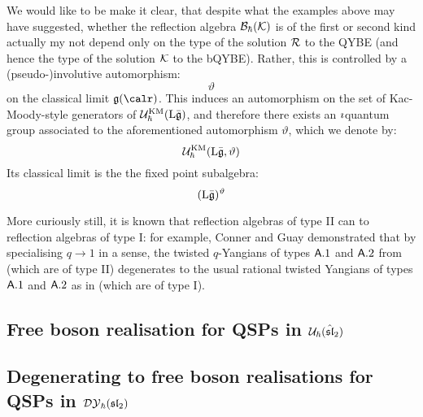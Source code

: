         We would like to be make it clear, that despite what the examples above may have suggested, whether the reflection algebra $\mathcal{B}_{\hbar}(\mathcal{K})$ is of the first or second kind actually my not depend only on the type of the solution $\mathcal{R}$ to the QYBE (and hence the type of the solution $\mathcal{K}$ to the bQYBE). Rather, this is controlled by a (pseudo-)involutive automorphism:
            $$\vartheta$$
        on the classical limit $\g(\calr)$. This induces an automorphism on the set of Kac-Moody-style generators of $\mathcal{U}_{\hbar}^{\mathrm{KM}}(\mathrm{L} \bar{\mathfrak{g}})$, and therefore there exists an $\imath$quantum group associated to the aforementioned automorphism $\vartheta$, which we denote by:
            $$\mathcal{U}_{\hbar}^{\mathrm{KM}}(\mathrm{L} \bar{\mathfrak{g}}, \vartheta)$$
        Its classical limit is the the fixed point subalgebra:
            $$(\mathrm{L} \bar{\mathfrak{g}})^{\vartheta}$$

        \begin{remark}
            More curiously still, it is known that reflection algebras of type II can  to reflection algebras of type I: for example, Conner and Guay demonstrated that by specialising $q \to 1$ in a sense, the twisted $q$-Yangians of types $\mathsf{A}.1$ and $\mathsf{A}.2$ from \cite{molev_ragoucy_sorba_twisted_q_yangians_type_A} (which are of type II) degenerates to the usual rational twisted Yangians of types $\mathsf{A}.1$ and $\mathsf{A}.2$ as in \cite[Chapter 2]{molev_yangians_and_classical_lie_algebras} (which are of type I).
        \end{remark}

    \subsection{\texorpdfstring{Free boson realisation for QSPs in $\mathcal{U}_{\hbar}(\hat{\mathfrak{sl}}_2)$}{}}

    \subsection{\texorpdfstring{Degenerating to free boson realisations for QSPs in $\mathcal{DY}_{\hbar}(\mathfrak{sl}_2)$}{}}